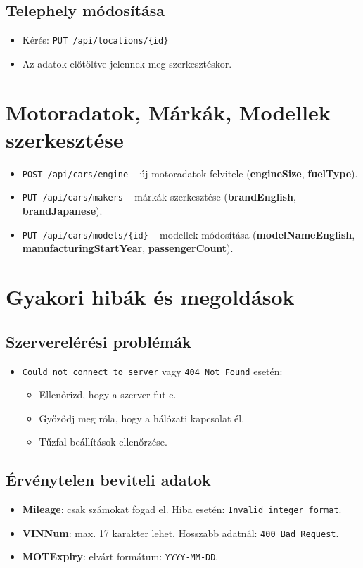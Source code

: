 \documentclass{report}[11pt]
\begin{document}
\subsection{Telephely módosítása}
\begin{itemize}
    \item Kérés: \texttt{PUT /api/locations/\{id\}}
    \item Az adatok előtöltve jelennek meg szerkesztéskor.
\end{itemize}

\section{Motoradatok, Márkák, Modellek szerkesztése}
\begin{itemize}
    \item \texttt{POST /api/cars/engine} – új motoradatok felvitele (\textbf{engineSize}, \textbf{fuelType}).
    \item \texttt{PUT /api/cars/makers} – márkák szerkesztése (\textbf{brandEnglish}, \textbf{brandJapanese}).
    \item \texttt{PUT /api/cars/models/\{id\}} – modellek módosítása (\textbf{modelNameEnglish}, \textbf{manufacturingStartYear}, \textbf{passengerCount}).
\end{itemize}

\section{Gyakori hibák és megoldások}
\subsection{Szerverelérési problémák}
\begin{itemize}
    \item \texttt{Could not connect to server} vagy \texttt{404 Not Found} esetén:
    \begin{itemize}
        \item Ellenőrizd, hogy a szerver fut-e.
        \item Győződj meg róla, hogy a hálózati kapcsolat él.
        \item Tűzfal beállítások ellenőrzése.
    \end{itemize}
\end{itemize}

\subsection{Érvénytelen beviteli adatok}
\begin{itemize}
    \item \textbf{Mileage}: csak számokat fogad el. Hiba esetén: \texttt{Invalid integer format}.
    \item \textbf{VINNum}: max. 17 karakter lehet. Hosszabb adatnál: \texttt{400 Bad Request}.
    \item \textbf{MOTExpiry}: elvárt formátum: \texttt{YYYY-MM-DD}.
\end{itemize}
\end{document}
